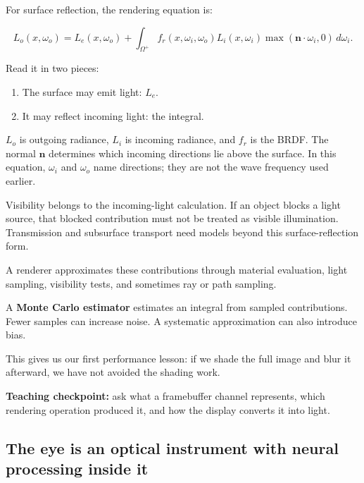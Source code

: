 For surface reflection, the rendering equation is:

\[
L_o(x,\omega_o)=L_e(x,\omega_o)+
\int_{\Omega^+}
f_r(x,\omega_i,\omega_o)L_i(x,\omega_i)
\max(\mathbf n\cdot\omega_i,0)\,d\omega_i.
\]

Read it in two pieces:

\begin{enumerate}
\def\labelenumi{\arabic{enumi}.}
\tightlist
\item
  The surface may emit light: \(L_e\).
\item
  It may reflect incoming light: the integral.
\end{enumerate}

\(L_o\) is outgoing radiance, \(L_i\) is incoming radiance, and \(f_r\) is the BRDF. The normal \(\mathbf n\) determines which incoming directions lie above the surface. In this equation, \(\omega_i\) and \(\omega_o\) name directions; they are not the wave frequency used earlier.

Visibility belongs to the incoming-light calculation. If an object blocks a light source, that blocked contribution must not be treated as visible illumination. Transmission and subsurface transport need models beyond this surface-reflection form.

A renderer approximates these contributions through material evaluation, light sampling, visibility tests, and sometimes ray or path sampling.

A \textbf{Monte Carlo estimator} estimates an integral from sampled contributions. Fewer samples can increase noise. A systematic approximation can also introduce bias.

This gives us our first performance lesson: if we shade the full image and blur it afterward, we have not avoided the shading work.

\textbf{Teaching checkpoint:} ask what a framebuffer channel represents, which rendering operation produced it, and how the display converts it into light.

\subsection{The eye is an optical instrument with neural processing inside it}\label{04-visual-computing-ii-ch042-the-eye-is-an-optical-instrument-with-neural-processing-inside-it}

\hypertarget{04-visual-computing-ii-ch042-the-eye-is-an-optical-instrument-with-neural-processing-inside-it}{}

